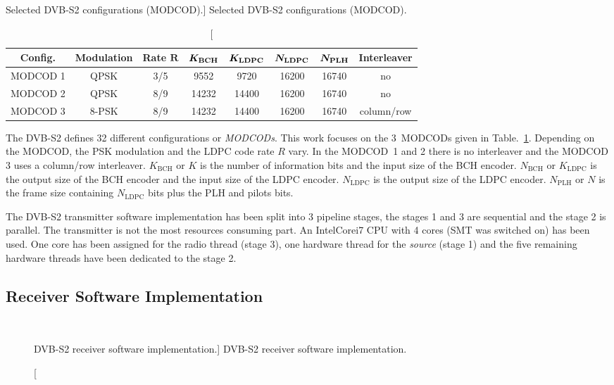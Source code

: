 \begin{table}[htp]
  \centering
  \caption
    [Selected DVB-S2 configurations (MODCOD).]
    {Selected DVB-S2 configurations (MODCOD).}
  \label{tab:sdr_dvbs2_modcod}
  \begin{tabular}{c c c c c c c c}
    \textbf{Config.} & \textbf{Modulation} & \textbf{Rate} $\bm{R}$ & $\bm{K_\text{\textbf{BCH}}}$ & $\bm{K_\text{\textbf{LDPC}}}$ & $\bm{N_\text{\textbf{LDPC}}}$ & $\bm{N_\text{\textbf{PLH}}}$ & \textbf{Interleaver}\\
    \hline \hline
    MODCOD 1 &  QPSK & 3/5 &  9552 &  9720 & 16200 & 16740 & no\\
    MODCOD 2 &  QPSK & 8/9 & 14232 & 14400 & 16200 & 16740 & no\\
    MODCOD 3 & 8-PSK & 8/9 & 14232 & 14400 & 16200 & 16740 & column/row\\
  \end{tabular}
\end{table}

The DVB-S2 defines 32 different configurations or \emph{MODCODs}. This work
focuses on the 3~MODCODs given in Table.~\ref{tab:sdr_dvbs2_modcod}. Depending
on the MODCOD, the PSK modulation and the LDPC code rate $R$ vary. In the
MODCOD~1 and 2 there is no interleaver and the MODCOD 3 uses a column/row
interleaver. $K_\text{BCH}$ or $K$ is the number of information bits and the
input size of the BCH encoder. $N_\text{BCH}$ or $K_\text{LDPC}$ is the output
size of the BCH encoder and the input size of the LDPC encoder. $N_\text{LDPC}$
is the output size of the LDPC encoder. $N_\text{PLH}$ or $N$ is the frame size
containing $N_\text{LDPC}$ bits plus the PLH and pilots bits.

The DVB-S2 transmitter software implementation has been split into 3 pipeline
stages, the stages 1 and 3 are sequential and the stage 2 is parallel. The
transmitter is not the most resources consuming part. An Intel\R Core\TM i7 CPU
with 4 cores (SMT was switched on) has been used. One core has been assigned for
the radio thread (stage 3), one hardware thread for the \emph{source} (stage 1)
and the five remaining hardware threads have been dedicated to the stage 2.

\subsection{Receiver Software Implementation}

\begin{figure}[htp]
  \centering
  \\
  \caption
    [DVB-S2 receiver software implementation.]
    {DVB-S2 receiver software implementation.}
  \label{fig:sdr_dvbs2_receiver}
\end{figure}

